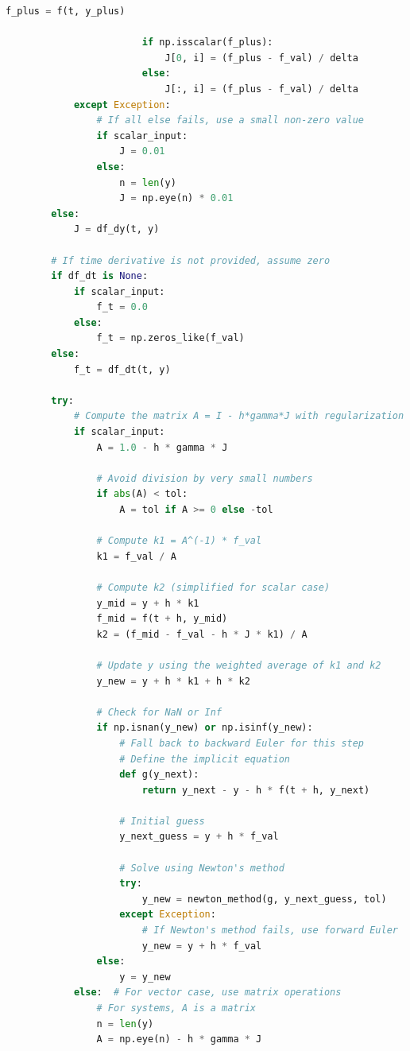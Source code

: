 \documentclass[11pt,a4paper]{article}
\begin{document}
\begin{lstlisting}[language=Python, caption=Improved Rosenbrock Method Implementation]
                        f_plus = f(t, y_plus)
                        
                        if np.isscalar(f_plus):
                            J[0, i] = (f_plus - f_val) / delta
                        else:
                            J[:, i] = (f_plus - f_val) / delta
            except Exception:
                # If all else fails, use a small non-zero value
                if scalar_input:
                    J = 0.01
                else:
                    n = len(y)
                    J = np.eye(n) * 0.01
        else:
            J = df_dy(t, y)
        
        # If time derivative is not provided, assume zero
        if df_dt is None:
            if scalar_input:
                f_t = 0.0
            else:
                f_t = np.zeros_like(f_val)
        else:
            f_t = df_dt(t, y)
        
        try:
            # Compute the matrix A = I - h*gamma*J with regularization
            if scalar_input:
                A = 1.0 - h * gamma * J
                
                # Avoid division by very small numbers
                if abs(A) < tol:
                    A = tol if A >= 0 else -tol
                
                # Compute k1 = A^(-1) * f_val
                k1 = f_val / A
                
                # Compute k2 (simplified for scalar case)
                y_mid = y + h * k1
                f_mid = f(t + h, y_mid)
                k2 = (f_mid - f_val - h * J * k1) / A
                
                # Update y using the weighted average of k1 and k2
                y_new = y + h * k1 + h * k2
                
                # Check for NaN or Inf
                if np.isnan(y_new) or np.isinf(y_new):
                    # Fall back to backward Euler for this step
                    # Define the implicit equation
                    def g(y_next):
                        return y_next - y - h * f(t + h, y_next)
                    
                    # Initial guess
                    y_next_guess = y + h * f_val
                    
                    # Solve using Newton's method
                    try:
                        y_new = newton_method(g, y_next_guess, tol)
                    except Exception:
                        # If Newton's method fails, use forward Euler
                        y_new = y + h * f_val
                else:
                    y = y_new
            else:  # For vector case, use matrix operations
                # For systems, A is a matrix
                n = len(y)
                A = np.eye(n) - h * gamma * J
                

\end{lstlisting}
\end{document}
